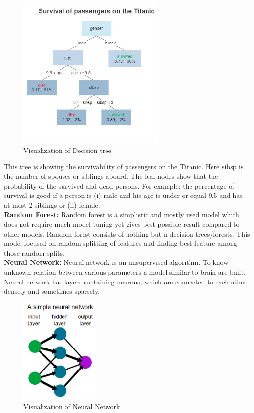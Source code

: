 \begin{figure}[H]
    \centering
    \includegraphics[width=0.65\textwidth]{dt}
    \caption{Visualization of Decision tree \cite{wiki:Decision_tree_learning} }
    \label{fig:DTfig}
\end{figure}

This tree is showing the survivability of passengers on the Titanic. Here sibsp is the number of spouses or siblings aboard. The leaf nodes show that the probability of the survived and dead persons. For example: the percentage of survival is good if a person is (i) male and his age is under or equal 9.5 and has at most 2 siblings or (ii) female.  \\[5pt]

\textbf{Random Forest:} Random forest is a simplistic and mostly used model which does not require much model tuning yet gives best possible result compared to other models. Random forest consists of nothing but n-decision trees/forests. This model focused on random splitting of features and finding best feature among those random splits.\\[5pt]

\textbf{Neural Network:} Neural network is an unsupervised algorithm. To know unknown relation between various parameters a model similar to brain are built. Neural network has layers containing neurons, which are connected to each other densely and sometimes sparsely.\\[5pt]

\begin{figure}[H]
    \centering
    \includegraphics[width=0.35\textwidth]{nn}
    \caption{Visualization of Neural Network\cite{wiki:Neural_network} }
    \label{fig:NNfig}
\end{figure}

